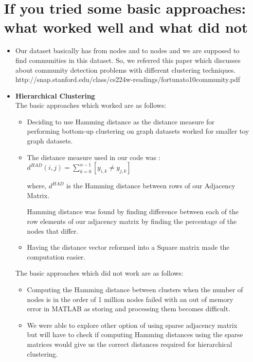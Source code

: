\documentclass[11pt]{exam}
\begin{document}
\section{ If you tried some basic approaches: what worked well and what did not }

\begin{itemize}
\item[]

Our dataset basically has from nodes and to nodes and we are supposed to find communities in this dataset. So, we referred this paper which discusses about community detection problems with different clustering techniques.  \\

http://snap.stanford.edu/class/cs224w-readings/fortunato10community.pdf

\item\textbf{Hierarchical Clustering}\\

The basic approaches which worked are as follows:
\begin{itemize}
	\item Deciding to use Hamming distance as the distance measure for performing bottom-up clustering on graph datasets worked for smaller toy graph datasets.

	\item The distance measure used in our code was : \\
	$d^{HAD}(i,j)=\sum_{k=0}^{n-1}[y_{i,k} \neq y_{j,k}]$ 

where, $d^{HAD}$ is the Hamming distance between rows of our Adjacency Matrix.

Hamming distance was found by finding difference between each of the row elements of our adjacency matrix by finding the percentage of the nodes that differ. 

\item Having the distance vector reformed into a Square matrix made the computation easier. 
\end{itemize}
 
The basic approaches which did not work are as follows:
\begin{itemize}
	\item Computing the Hamming distance between clusters when the number of nodes is in the order of 1 million nodes failed with an out of memory error in MATLAB as storing and processing them becomes difficult.
	\item We were able to explore other option of using sparse adjacency matrix but will have to check if computing Hamming distances using the sparse matrices would give us the correct distances required for hierarchical clustering.


\end{itemize}
\end{itemize}
\end{document}
